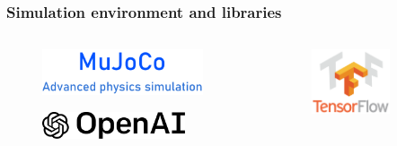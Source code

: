 \begin{frame}
	\frametitle{Simulation environment and libraries}

		\begin{columns}
			\begin{column}{.5\textwidth}
				\begin{figure}
				\centering
				\includegraphics[width=0.9\textwidth]{mujoco_logo.pdf}
				\end{figure}
				\vspace{20px}
				\begin{figure}
					\centering
					\includegraphics[width=0.8\textwidth]{openAI_logo.pdf}
				\end{figure}
			\end{column}
			\begin{column}{.5\textwidth}
				\begin{figure}
				\centering
				\includegraphics[width=0.7\textwidth]{tensorflow.pdf} 
				\end{figure}
			\end{column}
		\end{columns}	
	
\end{frame}

